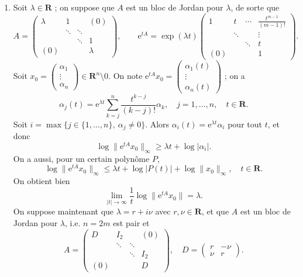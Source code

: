 \documentclass[a4paper,12pt,openany]{article}
\theoremstyle{plain}
\theoremstyle{definition}
\newcommand{\e}{\mathrm{e}}
\newcommand{\R}{\mathbf{R}}
\begin{document}
\begin{enumerate}[resume]
\item Soit $\lambda \in \R$ ; on suppose que $A$ est un bloc de Jordan pour $\lambda$, de sorte que
\begin{equation}\label{eq:jordan1}
A = \begin{pmatrix} \lambda & 1 & & (0) \\  & \ddots & \ddots&  \\ & & \ddots & 1 \\ (0) & & & \lambda \end{pmatrix},
 \quad  \quad
\e^{tA} = \exp(\lambda t) 
\begin{pmatrix}
1 & t & \cdots &\displaystyle{ \frac{t^{m-1}}{(m-1)!}} \\
& \ddots & & \vdots \\
& & \ddots & t \\
(0) & & & 1
\end{pmatrix}.
\end{equation}
Soit $x_0 = \begin{pmatrix} \alpha_1 \\ \vdots \\ \alpha_n \end{pmatrix} \in \R^n \setminus 0$. On note $\e^{tA}x_0 = \begin{pmatrix} \alpha_1(t) \\ \vdots \\ \alpha_n(t) \end{pmatrix}$ ; on a 
$$
\alpha_j(t) = \e^{\lambda t}\sum_{k=j}^n \frac{t^{k-j}}{(k-j)!}\alpha_k, \quad j = 1, \dots, n, \quad t \in \R.
$$
Soit $i = \max\{j \in \{1, \dots, n\}, ~\alpha_j \neq 0\}.$ Alors $\alpha_i(t) = \e^{\lambda t} \alpha_i$ pour tout $t$, et donc
$$
\log  \|\e^{tA}x_0\|_\infty \geq \lambda t + \log |\alpha_i|.
$$
On a aussi, pour un certain polyn\^ome $P$,
$$
\log \|\e^{tA}x_0\|_\infty \leq \lambda t + \log |P(t)| + \log \|x_0\|_\infty, \quad t \in \R.
$$
On obtient bien
$$
\lim_{|t|\to \infty} \frac{1}{t} \log \|\e^{tA}x_0\| = \lambda.
$$
On suppose maintenant que $\lambda = r + i \nu$ avec $r, \nu \in \R$, et que $A$ est un bloc de Jordan pour $\lambda$, i.e. $n=2m$ est pair et
\begin{equation}\label{eq:jordan2}
A = \begin{pmatrix} D & I_2 & & (0) \\  & \ddots & \ddots&  \\ & & \ddots & I_2 \\ (0) & & & D \end{pmatrix}, \quad D = \begin{pmatrix} r & -\nu \\ \nu & r \end{pmatrix}.

\end{equation}
\end{enumerate}
\end{document}
